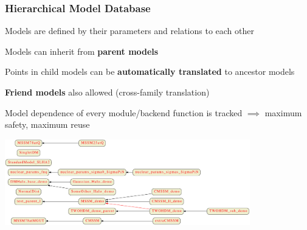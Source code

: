 \documentclass[xcolor=dvipsnames]{beamer}
\begin{document}
\begin{frame}
\frametitle{Hierarchical Model Database}

\bi
  \item Models are defined by their parameters and relations to each other
  \item Models can inherit from \textbf{parent models}
  \item Points in child models can be \textbf{automatically translated} to ancestor models
  \item \textbf{Friend models} also allowed (cross-family translation)
  \item Model dependence of every module/backend function is tracked $\implies$ \alert{maximum safety, maximum reuse}
\ei

\includegraphics[width=0.8\textwidth]{GAMBIT_model_hierarchy}

\end{frame}
\end{document}
